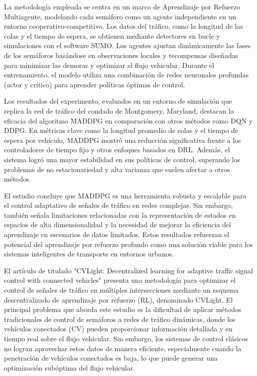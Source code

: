 La metodología empleada se centra en un marco de Aprendizaje por Refuerzo Multiagente, modelando cada semáforo como un agente independiente en un entorno cooperativo-competitivo. Los datos del tráfico, como la longitud de las colas y el tiempo de espera, se obtienen mediante detectores en bucle y simulaciones con el software SUMO. Los agentes ajustan dinámicamente las fases de los semáforos basándose en observaciones locales y recompensas diseñadas para minimizar las demoras y optimizar el flujo vehicular. Durante el entrenamiento, el modelo utiliza una combinación de redes neuronales profundas (actor y crítico) para aprender políticas óptimas de control.

Los resultados del experimento, evaluados en un entorno de simulación que replica la red de tráfico del condado de Montgomery, Maryland, destacan la eficacia del algoritmo MADDPG en comparación con otros métodos como DQN y DDPG. En métricas clave como la longitud promedio de colas y el tiempo de espera por vehículo, MADDPG mostró una reducción significativa frente a los controladores de tiempo fijo y otros enfoques basados en DRL. Además, el sistema logró una mayor estabilidad en sus políticas de control, superando los problemas de no estacionariedad y alta varianza que suelen afectar a otros métodos.

El estudio concluye que MADDPG es una herramienta robusta y escalable para el control adaptativo de señales de tráfico en redes complejas. Sin embargo, también señala limitaciones relacionadas con la representación de estados en espacios de alta dimensionalidad y la necesidad de mejorar la eficiencia del aprendizaje en escenarios de datos limitados. Estos resultados refuerzan el potencial del aprendizaje por refuerzo profundo como una solución viable para los sistemas inteligentes de transporte en entornos urbanos.

El artículo de \cite{Mo2022} titulado "CVLight: Decentralized learning for adaptive traffic signal control with connected vehicles" presenta una metodología para optimizar el control de señales de tráfico en múltiples intersecciones mediante un esquema descentralizado de aprendizaje por refuerzo (RL), denominado CVLight. El principal problema que aborda este estudio es la dificultad de aplicar métodos tradicionales de control de semáforos a redes de tráfico dinámicas, donde los vehículos conectados (CV) pueden proporcionar información detallada y en tiempo real sobre el flujo vehicular. Sin embargo, los sistemas de control clásicos no logran aprovechar estos datos de manera eficiente, especialmente cuando la penetración de vehículos conectados es baja, lo que puede generar una optimización subóptima del flujo vehicular.

